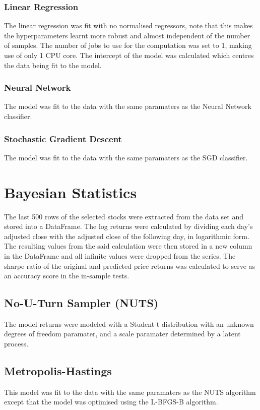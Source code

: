 \subsubsection{Linear Regression}
The linear regression was fit with no normalised regressors, note that this makes the hyperparameters learnt more robust and almost independent of the number of samples. The number of jobs to use for the computation was set to 1, making use of only 1 CPU core. The intercept of the model was calculated which centres the data being fit to the model.

\subsubsection{Neural Network}
The model was fit to the data with the same paramaters as the Neural Network classifier.

\subsubsection{Stochastic Gradient Descent}
The model was fit to the data with the same paramaters as the SGD classifier.

\section{Bayesian Statistics}
The last 500 rows of the selected stocks were extracted from the data set and stored into a DataFrame. The log returns were calculated by dividing each day's adjusted close with the adjusted close of the following day, in logarithmic form. The resulting values from the said calculation were then stored in a new column in the DataFrame and all infinite values were dropped from the series. The sharpe ratio of the original and predicted price returns was calculated to serve as an accuracy score in the in-sample tests.

\subsection{No-U-Turn Sampler (NUTS)}
The model returns were modeled with a Student-t distribution with an unknown degrees of freedom paramater, and a scale paramater determined by a latent process. 

\subsection{Metropolis-Hastings}
This model was fit to the data with the same paramaters as the NUTS algorithm except that the model was optimised using the L-BFGS-B algorithm.

